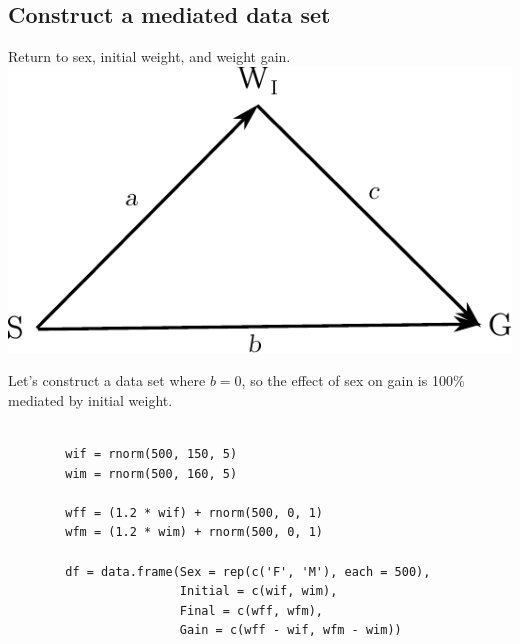 \documentclass[xcolor=dvipsnames]{beamer}
\begin{document}
\subsection{Construct a mediated data set}
\begin{frame}{}
	Return to sex, initial weight, and weight gain.
	\includegraphics{arrow_diag.pdf}

	Let's construct a data set where $b = 0$, so the effect of sex on gain is
	100\% mediated by initial weight.
\end{frame}

\begin{frame}
	\begin{lstlisting}
		
		wif = rnorm(500, 150, 5)
		wim = rnorm(500, 160, 5)

		wff = (1.2 * wif) + rnorm(500, 0, 1)
		wfm = (1.2 * wim) + rnorm(500, 0, 1)

		df = data.frame(Sex = rep(c('F', 'M'), each = 500),
						Initial = c(wif, wim),
						Final = c(wff, wfm),
						Gain = c(wff - wif, wfm - wim))
	\end{lstlisting}
\end{frame} 
\end{document}
